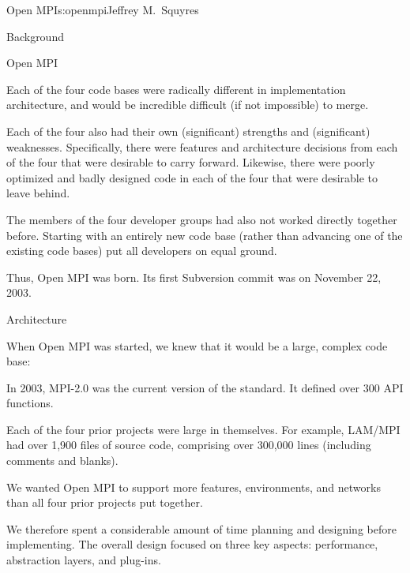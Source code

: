 \begin{aosachapter}{Open MPI}{s:openmpi}{Jeffrey M.\ Squyres}
\begin{aosasect1}{Background}
\begin{aosasect2}{Open MPI}
\begin{aosaitemize}
\item Each of the four code bases were radically different in
  implementation architecture, and would be incredible difficult (if
  not impossible) to merge.
\item Each of the four also had their own (significant) strengths and
  (significant) weaknesses.  Specifically, there were features and
  architecture decisions from each of the four that were desirable to
  carry forward.  Likewise, there were poorly optimized and badly
  designed code in each of the four that were desirable to leave
  behind.
\item The members of the four developer groups had also not worked
  directly together before.  Starting with an entirely new code base
  (rather than advancing one of the existing code bases) put all
  developers on equal ground.
\end{aosaitemize}

Thus, Open MPI was born.  Its first Subversion commit was on November
22, 2003.

\end{aosasect2}

\end{aosasect1}


\begin{aosasect1}{Architecture}

When Open MPI was started, we knew that it would be a large, complex
code base:

\begin{aosaitemize}
\item In 2003, MPI-2.0 was the current version of the standard.  It
  defined over 300 API functions.
\item Each of the four prior projects were large in themselves.  For
  example, LAM/MPI had over 1,900 files of source code, comprising
  over 300,000 lines (including comments and blanks).
\item We wanted Open MPI to support more features, environments, and
  networks than all four prior projects put together.
\end{aosaitemize}

We therefore spent a considerable amount of time planning and
designing before implementing.  The overall design focused on three
key aspects: performance, abstraction layers, and plug-ins.


\end{aosasect1}
\end{aosachapter}
